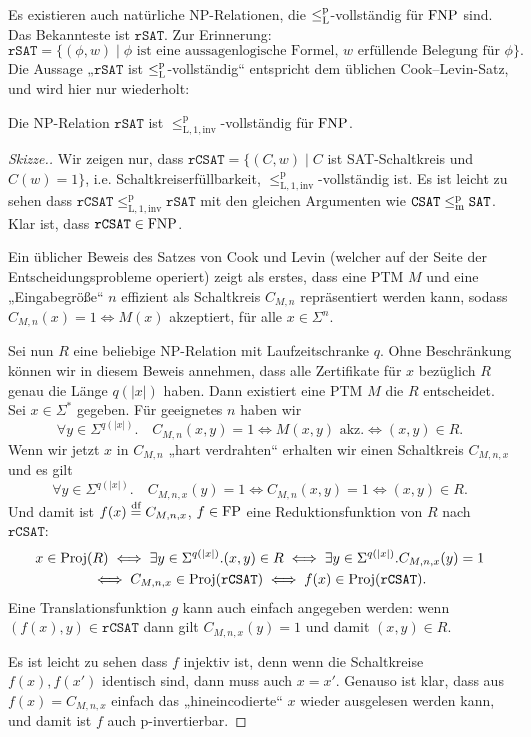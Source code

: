 Es existieren auch natürliche NP-Relationen, die $\leq_\mathrm{L}^\mathrm{p}$-vollständig für $\mathrm{FNP}$ sind.
Das Bekannteste ist $\mathtt{rSAT}$. Zur Erinnerung:
\[ \mathtt{rSAT} = \{ (\phi, w) \mid \text{$\phi$ ist eine aussagenlogische Formel, $w$ erfüllende Belegung für $\phi$} \}. \]
Die Aussage „$\mathtt{rSAT}$ ist $\leq_\mathrm{L}^\mathrm{p}$-vollständig“ entspricht dem üblichen Cook--Levin-Satz, und wird hier nur wiederholt:
\begin{theorem}
    Die NP-Relation $\mathtt{rSAT}$ ist $\leq_\mathrm{L,1,inv}^\mathrm p$-vollständig für $\mathrm{FNP}$.
\end{theorem}
\begin{proof}[Skizze.]
    Wir zeigen nur, dass $\mathtt{rCSAT}=\{(C, w) \mid C$ ist SAT-Schaltkreis und $C(w)=1\}$, i.e. Schaltkreiserfüllbarkeit, $\leq_\mathrm{L,1,inv}^\mathrm p$-vollständig ist. Es ist leicht zu sehen dass $\mathtt{rCSAT}\leq_\mathrm{L,1,inv}^\mathrm p \mathtt{rSAT}$ mit den gleichen Argumenten wie $\mathtt{CSAT}\leq_\mathrm{m}^\mathrm{p} \mathtt{SAT}$. Klar ist, dass $\mathtt{rCSAT}\in\mathrm{FNP}$.

    Ein üblicher Beweis des Satzes von Cook und Levin (welcher auf der Seite der Entscheidungsprobleme operiert) zeigt als erstes, dass eine PTM $M$ und eine „Eingabegröße“ $n$ effizient als Schaltkreis $C_{M,n}$ repräsentiert werden kann, sodass $C_{M,n}(x)=1 \iff M(x)$ akzeptiert, für alle $x\in\Sigma^{n}$.

    Sei nun $R$ eine beliebige NP-Relation mit Laufzeitschranke $q$. Ohne Beschränkung können wir in diesem Beweis annehmen, dass alle Zertifikate für $x$ bezüglich $R$ genau die Länge $q(|x|)$ haben. Dann existiert eine PTM $M$ die $R$ entscheidet. Sei $x\in\Sigma^*$ gegeben. Für geeignetes $n$ haben wir
    \[ \forall y\in\Sigma^{q(|x|)}.\quad C_{M,n}(x,y)=1 \iff M(x,y)\text{ akz.} \iff (x,y)\in R. \]
    Wenn wir jetzt $x$ in $C_{M,n}$ „hart verdrahten“ erhalten wir einen Schaltkreis $C_{M,n,x}$ und es gilt
    \[ \forall y\in\Sigma^{q(|x|)}.\quad C_{M,n,x}(y)=1 \iff C_{M,n}(x,y)=1 \iff (x,y)\in R. \]
    Und damit ist $f(x) \stackrel{\text{df}}{=} C_{M,n,x}$, $f\in\mathrm{FP}$ eine Reduktionsfunktion von $R$ nach $\mathtt{rCSAT}$:
    \begin{gather*}
    x\in \operatorname{Proj}(R) \iff \exists  y\in\Sigma^{q(|x|)}.(x,y)\in R \iff \exists y\in\Sigma^{q(|x|)}.C_{M,n,x}(y)=1 \\\iff C_{M,n,x}\in\operatorname{Proj}(\mathtt{rCSAT}) \iff f(x)\in\operatorname{Proj}(\mathtt{rCSAT}). \end{gather*}
    Eine Translationsfunktion $g$ kann auch einfach angegeben werden: wenn $(f(x), y)\in \mathtt{rCSAT}$ dann gilt $C_{M,n,x}(y)=1$ und damit  $(x,y)\in R$.

    Es ist leicht zu sehen dass $f$ injektiv ist, denn wenn die Schaltkreise $f(x), f(x')$ identisch sind, dann muss auch $x=x'$. Genauso ist klar, dass aus $f(x)=C_{M,n,x}$ einfach das „hineincodierte“ $x$ wieder ausgelesen werden kann, und damit ist $f$ auch p-invertierbar.
\end{proof}

